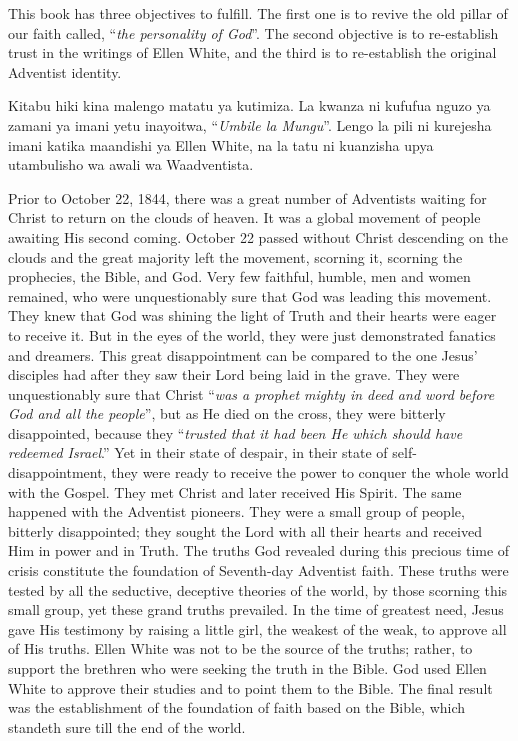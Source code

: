 







This book has three objectives to fulfill. The first one is to revive the old pillar of our faith called, “\textit{the personality of God}”. The second objective is to re-establish trust in the writings of Ellen White, and the third is to re-establish the original Adventist identity.


Kitabu hiki kina malengo matatu ya kutimiza. La kwanza ni kufufua nguzo ya zamani ya imani yetu inayoitwa, “\textit{Umbile la Mungu}”. Lengo la pili ni kurejesha imani katika maandishi ya Ellen White, na la tatu ni kuanzisha upya utambulisho wa awali wa Waadventista.


Prior to October 22, 1844, there was a great number of Adventists waiting for Christ to return on the clouds of heaven. It was a global movement of people awaiting His second coming. October 22 passed without Christ descending on the clouds and the great majority left the movement, scorning it, scorning the prophecies, the Bible, and God. Very few faithful, humble, men and women remained, who were unquestionably sure that God was leading this movement. They knew that God was shining the light of Truth and their hearts were eager to receive it. But in the eyes of the world, they were just demonstrated fanatics and dreamers. This great disappointment can be compared to the one Jesus’ disciples had after they saw their Lord being laid in the grave. They were unquestionably sure that Christ “\textit{was a prophet mighty in deed and word before God and all the people}”, but as He died on the cross, they were bitterly disappointed, because they “\textit{trusted that it had been He which should have redeemed Israel}.” Yet in their state of despair, in their state of self-disappointment, they were ready to receive the power to conquer the whole world with the Gospel. They met Christ and later received His Spirit. The same happened with the Adventist pioneers. They were a small group of people, bitterly disappointed; they sought the Lord with all their hearts and received Him in power and in Truth. The truths God revealed during this precious time of crisis constitute the foundation of Seventh-day Adventist faith. These truths were tested by all the seductive, deceptive theories of the world, by those scorning this small group, yet these grand truths prevailed. In the time of greatest need, Jesus gave His testimony by raising a little girl, the weakest of the weak, to approve all of His truths. Ellen White was not to be the source of the truths; rather, to support the brethren who were seeking the truth in the Bible. God used Ellen White to approve their studies and to point them to the Bible. The final result was the establishment of the foundation of faith based on the Bible, which standeth sure till the end of the world.



